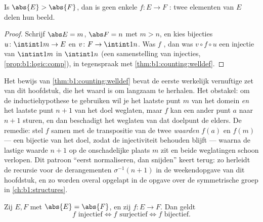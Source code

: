 \begin{corollary}[Duivenhokprincipe]\label{cor:b1:counting:pigeonhole}
Is $\abs{E} > \abs{F}$, dan is geen enkele  $f \colon E \to F$
: twee elementen van $E$ delen hun
beeld.
\end{corollary}

\begin{proof}
Schrijf $\abs E = m$, $\abs F = n$ met $m > n$, en kies bijecties $u
\colon \intint1m \to E$ en $v \colon F \to \intint1n$. Was $f$ ,
dan was $v \circ f \circ u$ een injectie van $\intint1m$ in $\intint1n$
(een samenstelling van injecties, \cref{prop:b1:logic:comp}), in
tegenspraak met \cref{thm:b1:counting:welldef}.
\end{proof}

\begin{remark}\label{rem:b1:counting:swapinterlude}
Het bewijs van \cref{thm:b1:counting:welldef} bevat de eerste
werkelijk vernuftige zet van dit hoofdstuk, die het waard is om
langzaam te herhalen. Het obstakel: om de inductiehypothese te
gebruiken wil je het laatste punt $m$ van het domein \emph{en} het
laatste punt $n+1$ van het doel weglaten, maar $f$ kan een ander
punt $a$ naar $n + 1$ sturen, en dan beschadigt het weglaten van
dat doelpunt de  elders. De remedie: stel $f$ samen met
de transpositie van de twee \emph{waarden} $f(a)$ en $f(m)$ --- een
bijectie van het doel, zodat de injectiviteit behouden blijft ---
waarna de lastige waarde $n + 1$ op de onschadelijke plaats $m$
zit en beide weglatingen schoon verlopen. Dit patroon
``eerst normaliseren, dan snijden'' keert terug: zo herleidt de
recursie voor de derangementen $\sigma^{-1}(n+1)$ in de
weekendopgave van dit hoofdstuk, en zo worden  overal
opgelapt in de opgave over de symmetrische groep in
\cref{ch:b1:structures}.
\end{remark}

\begin{proposition}\label{prop:b1:counting:injsur}
Zij $E, F$  met $\abs{E} = \abs{F}$, en zij $f
\colon E \to F$. Dan geldt
\[
f \text{ injectief} \iff f \text{ surjectief} \iff f \text{ bijectief}.
\]
\end{proposition}

